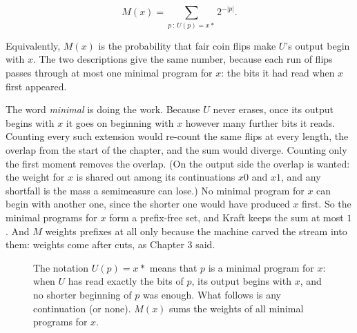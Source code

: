 $$M(x) = \sum_{p \,:\, U(p) = x{*}} 2^{-|p|}.$$

Equivalently, $M(x)$ is the probability that fair coin flips make $U$'s output begin with $x$. The two descriptions give the same number, because each run of flips passes through at most one minimal program for $x$: the bits it had read when $x$ first appeared.

The word \emph{minimal} is doing the work. Because $U$ never erases, once its output begins with $x$ it goes on beginning with $x$ however many further bits it reads. Counting every such extension would re-count the same flips at every length, the overlap from the start of the chapter, and the sum would diverge. Counting only the first moment removes the overlap. (On the output side the overlap is wanted: the weight for $x$ is shared out among its continuations $x0$ and $x1$, and any shortfall is the mass a semimeasure can lose.) No minimal program for $x$ can begin with another one, since the shorter one would have produced $x$ first. So the minimal programs for $x$ form a prefix-free set, and Kraft keeps the sum at most $1$. And $M$ weights prefixes at all only because the machine carved the stream into them: weights come after cuts, as Chapter 3 said.

\begin{figure}[h]
\centering
{}
\caption{The notation $U(p) = x{*}$ means that $p$ is a minimal program for $x$: when $U$ has read exactly the bits of $p$, its output begins with $x$, and no shorter beginning of $p$ was enough. What follows is any continuation (or none). $M(x)$ sums the weights of all minimal programs for $x$.}
\label{fig:prefix}
\end{figure}

